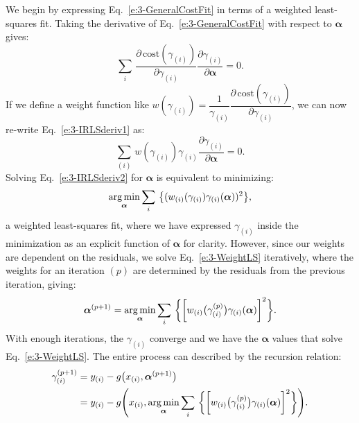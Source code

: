 We begin by expressing Eq.~\ref{e:3-GeneralCostFit} in terms of a weighted least-squares fit.
Taking the derivative of Eq.~\ref{e:3-GeneralCostFit} with respect to $\bm{\alpha}$ gives:
\begin{equation}
  \sum\limits_i\,\frac{\partial \, \textrm{cost}(\gamma_{(i)})}{\partial \gamma_{(i)}} \frac{\partial \gamma_{(i)}}{\partial \bm{\alpha}} = 0.\label{e:3-IRLSderiv1}
\end{equation}
If we define a weight function like $w(\gamma_{(i)}) = \dfrac{1}{\gamma_{(i)}}\dfrac{\partial \, \textrm{cost}(\gamma_{(i)})}{\partial \gamma_{(i)}}$, we can now re-write Eq.~\ref{e:3-IRLSderiv1} as:
\begin{equation}
  \sum\limits_{(i)}\,w(\gamma_{(i)}) \gamma_{(i)} \frac{\partial \gamma_{(i)}}{\partial \bm{\alpha}} = 0.\label{e:3-IRLSderiv2}
\end{equation}
 Solving Eq.~\ref{e:3-IRLSderiv2} for $\bm{\alpha}$ is equivalent to minimizing:
 \begin{equation}
   \operatorname*{arg\,min}_{\bm{\alpha}} \sum\limits_i\,\big \{ (w_{(i)}(\gamma_{(i)}) \gamma_{(i)}(\bm{\alpha}))^2 \big \},\label{e:3-WeightLS}
 \end{equation}
a weighted least-squares fit, where we have expressed $\gamma_{(i)}$ inside the minimization as an explicit function of $\bm{\alpha}$ for clarity.
However, since our weights are dependent on the residuals, we solve Eq.~\ref{e:3-WeightLS} iteratively, where the weights for an iteration $(p)$ are determined by the residuals from the previous iteration, giving:
\begin{equation}
  \bm{\alpha}^{(p+1)} = \operatorname*{arg\,min}_{\bm{\alpha}} \sum\limits_i\,\bigg \{ \bigg [w_{(i)} \big(\gamma_{(i)}^{(p)}\big ) \gamma_{(i)}(\bm{\alpha}) \bigg ]^2 \bigg \}.
\end{equation}
With enough iterations, the $\gamma_{(i)}$ converge and we have the $\bm{\alpha}$ values that solve Eq.~\ref{e:3-WeightLS}.
The entire process can described by the recursion relation:
\begin{align}
  \gamma_{(i)}^{(p+1)}
  &= y_{(i)} - g\big (x_{(i)},\bm{\alpha}^{(p+1)}\big ) \nonumber \\
  &= y_{(i)} - g\Bigg (x_{(i)}, \operatorname*{arg\,min}_{\bm{\alpha}} \sum\limits_i\,\bigg \{ \bigg [w_{(i)} \big(\gamma_{(i)}^{(p)}\big ) \gamma_{(i)}(\bm{\alpha}) \bigg ]^2 \bigg \} \Bigg).
\end{align}

